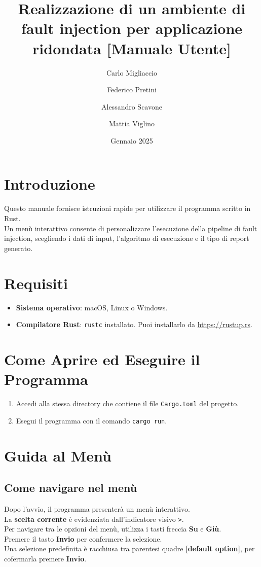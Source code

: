 \documentclass{article}
\title{\textbf{Realizzazione di un ambiente di fault injection per applicazione ridondata [Manuale Utente]}}
\author{Carlo Migliaccio}
\author{Federico Pretini}
\author{Alessandro Scavone}
\author{Mattia Viglino}
\affil[1]{\small{Laurea Magistrale in Ingegneria Informatica, Politecnico di Torino}}
\date{Gennaio 2025}
\begin{document}
\renewcommand{\labelenumii}{\arabic{enumi}.\arabic{enumii}}

\maketitle
\thispagestyle{empty}
\vspace{-0.8cm}
\tableofcontents
\newpage

\section*{Introduzione}
Questo manuale fornisce istruzioni rapide per utilizzare il programma scritto in Rust. \\
Un menù interattivo consente di personalizzare l'esecuzione della pipeline di fault injection, scegliendo i dati di input, l'algoritmo di esecuzione e il tipo di report generato.

\section{Requisiti}
\begin{itemize}
\item \textbf{Sistema operativo}: macOS, Linux o Windows.
\item \textbf{Compilatore Rust}: \texttt{rustc} installato. Puoi installarlo da \url{https://rustup.rs}.
\end{itemize}

\section{Come Aprire ed Eseguire il Programma}
\begin{enumerate}
\item Accedi alla stessa directory che contiene il file \texttt{Cargo.toml} del progetto.
\item Esegui il programma con il comando \texttt{cargo run}.
\end{enumerate}

\section{Guida al Menù}
\subsection{Come navigare nel menù}
Dopo l'avvio, il programma presenterà un menù interattivo.\\
La \textbf{scelta corrente} è evidenziata dall'indicatore visivo \texttt{>}.\\
Per navigare tra le opzioni del menù, utilizza i tasti freccia \textbf{Su} e \textbf{Giù}.\\
Premere il tasto \textbf{Invio} per confermere la selezione. \\ 
Una selezione predefinita è racchiusa tra parentesi quadre \textbf{[default option]}, per cofermarla premere \textbf{Invio}.
\end{document}
